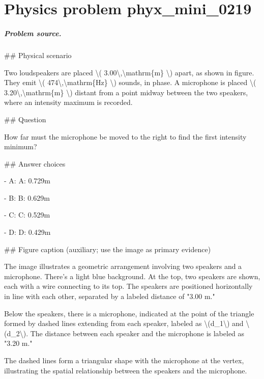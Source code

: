 
\chapter{Physics problem phyx\_mini\_0219}
\label{ch:PhyXMiniProblems_problem_phyx_mini_0219}

\paragraph{Problem source.}
\#\# Physical scenario

Two loudspeakers are placed \textbackslash{}( 3.00\textbackslash{},\textbackslash{}mathrm\{m\} \textbackslash{}) apart, as shown in figure. They emit \textbackslash{}( 474\textbackslash{},\textbackslash{}mathrm\{Hz\} \textbackslash{}) sounds, in phase. A microphone is placed \textbackslash{}( 3.20\textbackslash{},\textbackslash{}mathrm\{m\} \textbackslash{}) distant from a point midway between the two speakers, where an intensity maximum is recorded.

\#\# Question

How far must the microphone be moved to the right to find the first intensity minimum?

\#\# Answer choices

- A: A: 0.729m

- B: B: 0.629m

- C: C: 0.529m

- D: D: 0.429m

\#\# Figure caption (auxiliary; use the image as primary evidence)

The image illustrates a geometric arrangement involving two speakers and a microphone. There's a light blue background. At the top, two speakers are shown, each with a wire connecting to its top. The speakers are positioned horizontally in line with each other, separated by a labeled distance of "3.00 m."

Below the speakers, there is a microphone, indicated at the point of the triangle formed by dashed lines extending from each speaker, labeled as \textbackslash{}(d\_1\textbackslash{}) and \textbackslash{}(d\_2\textbackslash{}). The distance between each speaker and the microphone is labeled as "3.20 m." 

The dashed lines form a triangular shape with the microphone at the vertex, illustrating the spatial relationship between the speakers and the microphone.

